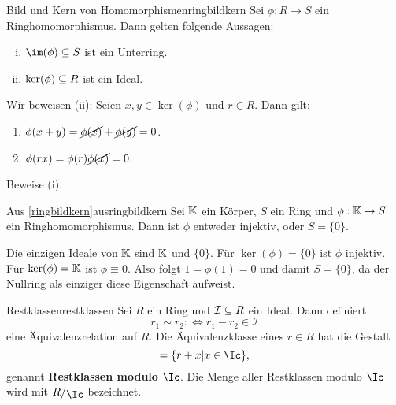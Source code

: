 \begin{satz}{Bild und Kern von Homomorphismen}{ringbildkern}
Sei $\phi: R \to S$ ein Ringhomomorphismus. Dann gelten folgende Aussagen:
\begin{enumerate}[(i)]
\item $\im (\phi) \sub S$ ist ein Unterring.
\item $\ker (\phi) \subseteq R$ ist ein Ideal.
\end{enumerate}
\end{satz}
\begin{beweis}
Wir beweisen (ii): Seien $x,y \in \ker (\phi)$ und $r \in R$. Dann gilt:
\begin{enumerate}
\item $\phi(x+y) = \cancel{\phi(x)} + \cancel{\phi(y)} = 0$.
\item $\phi(rx) = \phi(r) \cancel{\phi(x)} = 0$.
\end{enumerate}
\end{beweis}
\begin{übung}
Beweise (i).
\end{übung}
\begin{korollar}{Aus \ref{ringbildkern}}{ausringbildkern}
Sei $\mathbb{K}$ ein Körper, $S$ ein Ring und $\phi: \mathbb{K} \to S$ ein Ringhomomorphismus. Dann ist $\phi$ entweder injektiv, oder $S=\{0\}$.
\end{korollar}
\begin{beweis}
Die einzigen Ideale von $\mathbb{K}$ sind $\mathbb{K}$ und $\{0\}$. Für $\ker (\phi) = \{0\}$ ist $\phi$ injektiv. Für $\ker (\phi) = \mathbb{K}$ ist $\phi \equiv 0$. Also folgt $1 = \phi(1) = 0$ und damit $S=\{0\}$, da der Nullring als einziger diese Eigenschaft aufweist.
\end{beweis}
\begin{definition}{Restklassen}{restklassen}
Sei $R$ ein Ring und $\mathcal{I} \subseteq R$ ein Ideal. Dann definiert
\begin{equation}
r_1 \sim r_2 : \iff r_1 - r_2 \in \mathcal{I}
\end{equation}
eine Äquivalenzrelation auf $R$. Die Äquivalenzklasse eines $r \in R$ hat die Gestalt
\begin{equation}
[r] = \{r+x|x \in \Ic \},
\end{equation}
genannt \textbf{Restklassen modulo} $\Ic$. Die Menge aller Restklassen modulo $\Ic$ wird mit $\quotient{R}{\Ic}$ bezeichnet.
\end{definition}
